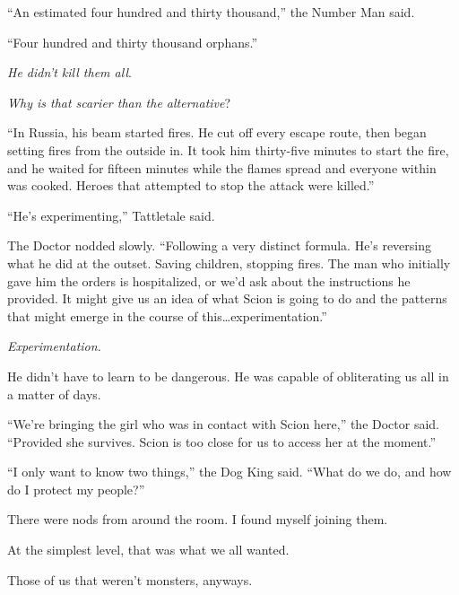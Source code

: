 ``An estimated four hundred and thirty thousand,'' the Number Man said.



``Four hundred and thirty thousand orphans.''



\emph{He didn't kill them all}.



\emph{Why is that scarier than the alternative}?



``In Russia, his beam started fires.  He cut off every escape route, then began setting fires from the outside in.  It took him thirty-five minutes to start the fire, and he waited for fifteen minutes while the flames spread and everyone within was cooked.  Heroes that attempted to stop the attack were killed.''



``He's experimenting,'' Tattletale said.



The Doctor nodded slowly.  ``Following a very distinct formula.  He's reversing what he did at the outset.  Saving children, stopping fires.  The man who initially gave him the orders is hospitalized, or we'd ask about the instructions he provided.  It might give us an idea of what Scion is going to do and the patterns that might emerge in the course of this\ldots experimentation.''



\emph{Experimentation.}



He didn't have to learn to be dangerous.  He was capable of obliterating us all in a matter of days.



``We're bringing the girl who was in contact with Scion here,'' the Doctor said.  ``Provided she survives.  Scion is too close for us to access her at the moment.''



``I only want to know two things,'' the Dog King said.  ``What do we do, and how do I protect my people?''



There were nods from around the room.  I found myself joining them.



At the simplest level, that was what we all wanted.



Those of us that weren't monsters, anyways.



